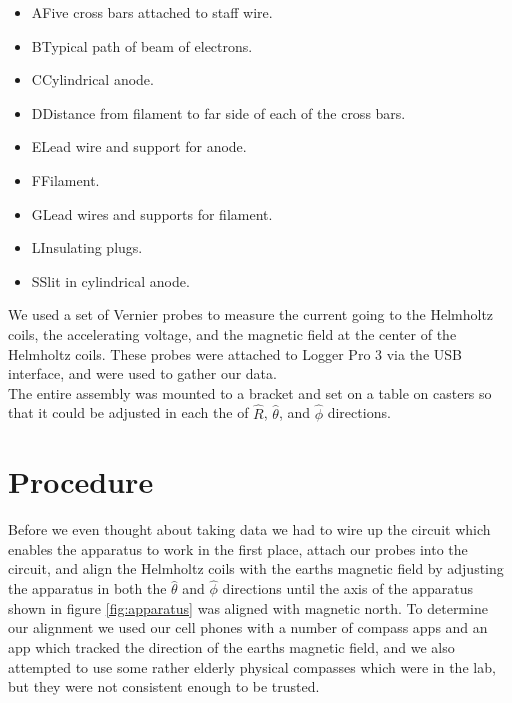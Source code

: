 \documentclass[aps,twocolumn,secnumarabic,amsmath,amssymb,nofootinbib]{revtex4-1}
\begin{document}
\begin{itemize}[label={}, nosep, noitemsep]
\item A\quad Five cross bars attached to staff wire.
\item B\quad Typical path of beam of electrons.
\item C\quad Cylindrical anode.
\item D\quad Distance from filament to far side of each of the cross bars.
\item E\quad Lead wire and support for anode.
\item F\quad Filament.
\item G\quad Lead wires and supports for filament.
\item L\quad Insulating plugs.
\item S\quad Slit in cylindrical anode. \\
\end{itemize}

We used a set of Vernier probes to measure the current going to the Helmholtz coils, the accelerating voltage, and the magnetic field at the center of the Helmholtz coils. These probes were attached to Logger Pro 3 via the USB interface, and were used to gather our data.\\

The entire assembly was mounted to a bracket and set on a table on casters so that it could be adjusted in each the of $\hat{R}$, $\hat{\theta}$, and $\hat{\phi}$ directions.


\section{Procedure}

Before we even thought about taking data we had to wire up the circuit which enables the apparatus to work in the first place, attach our probes into the circuit, and align the Helmholtz coils with the earths magnetic field by adjusting the apparatus in both the $\hat{\theta}$ and $\hat{\phi}$ directions until the axis of the apparatus shown in figure \ref{fig:apparatus} was aligned with magnetic north. To determine our alignment we used our cell phones with a number of compass apps and an app which tracked the direction of the earths magnetic field, and we also attempted to use some rather elderly physical compasses which were in the lab, but they were not consistent enough to be trusted.\\
\end{document}
